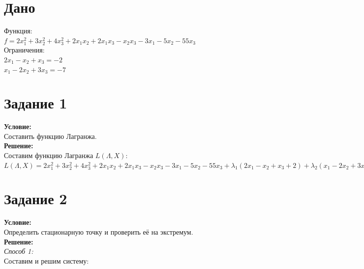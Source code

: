 \documentclass[14pt,a4paper,fleqn]{extarticle}
\begin{document}
	\section*{Дано}
	Функция:\\
	$f = 2x_1^2 + 3x_2^2 + 4x_3^2 + 2x_1x_2 + 2x_1x_3 - x_2x_3 - 3x_1 - 5x_2 - 55x_3$\\
	
	Ограничения:\\
	$2x_1 - x_2 + x_3 = -2$\\
	$x_1 - 2x_2 + 3x_3 = -7$
	
	\section*{Задание 1}
	\textbf{Условие:}\\
	Составить функцию Лагранжа.\\
	
	\textbf{Решение:}\\
	Составим функцию Лагранжа $L(\Lambda, X)$:\\
	
	$L(\Lambda, X) = 2x_1^2 + 3x_2^2 + 4x_3^2 + 2x_1x_2 + 2x_1x_3 - x_2x_3 - 3x_1 - 5x_2 - 55x_3 + \lambda_1(2x_1 - x_2 + x_3 + 2) + \lambda_2(x_1 - 2x_2 + 3x_3 + 7)$
	
	\newpage
	\section*{Задание 2}
	\textbf{Условие:}\\
	Определить стационарную точку и проверить её на экстремум.\\
	
	\textbf{Решение:}\\
	\textit{Способ 1:}\\
	Составим и решим систему:\\
	
	\\\\
	
\end{document}
